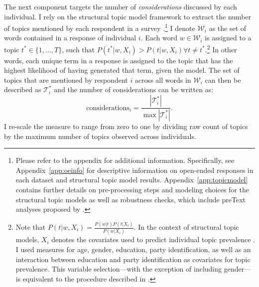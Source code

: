 The next component targets the number of \textit{considerations} discussed by each individual. I rely on the structural topic model framework to extract the number of topics mentioned by each respondent in a survey \citep{roberts2014structural}.\footnote{Please refer to the appendix for additional information. Specifically, see Appendix~\ref{app:oeinfo} for descriptive information on open-ended responses in each dataset and structural topic model results. Appendix~\ref{app:topicmodel} contains further details on pre-processing steps and modeling choices for the structural topic models as well as robustness checks, which include preText analyses proposed by \citet{denny2018text}.} I denote $\mathcal{W}_i$ as the set of words contained in a response of individual $i$. Each word $w\in\mathcal{W}_i$ is assigned to a topic $t^* \in \{1,...,T\} $, such that $P(t^*|w,X_i) > P(t|w,X_i) \forall t\neq t^*$.\footnote{Note that $P(t|w,X_i)=\tfrac{P(w|t)P(t|X_i)}{P(w|X_i)}$. In the context of structural topic models, $X_i$ denotes the covariates used to predict individual topic prevalence \citep[see][for details]{roberts2014structural}. I used measures for age, gender, education, party identification, as well as an interaction between education and party identification as covariates for topic prevalence. This variable selection---with the exception of including gender---is equivalent to the procedure described in \citet{roberts2014structural}.} In other words, each unique term in a response is assigned to the topic that has the highest likelihood of having generated that term, given the model. The set of topics that are mentioned by respondent $i$ across all words in $\mathcal{W}_i$ can then be described as $\mathcal{T}^*_i$ and the number of considerations can be written as:
\begin{equation}
\text{considerations}_i = \dfrac{|\mathcal{T}^*_i|}{\max|\mathcal{T}^*_i|}.
\end{equation}
I re-scale the measure to range from zero to one by dividing raw count of topics by the maximum number of topics observed across individuals.



